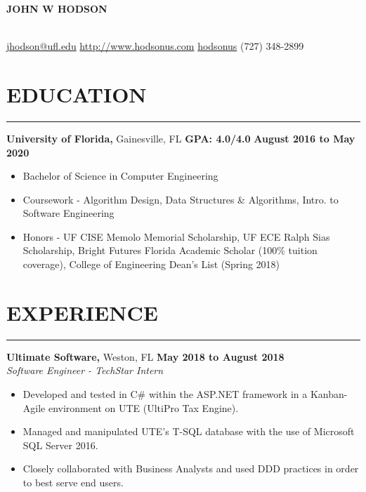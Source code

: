 \documentclass[11pt]{article} %
\begin{document}
	
	\noindent\centerline{ \huge\textbf{JOHN W HODSON}}\\
	
	\noindent\Email\space\href{mailto:jhodson@ufl.edu}{jhodson@ufl.edu} \hspace*{\fill} \ComputerMouse \space \href{http://www.hodsonus.com}{http://www.hodsonus.com} \hspace*{\fill} \faGithub \space \href{https://github.com/hodsonus}{hodsonus} \hspace*{\fill} \Mobilefone \space (727) 348-2899\\
	
	\section*{EDUCATION}
		\hrule \relax
		\vspace{.4cm}
		
		\noindent \textbf{University of Florida,} Gainesville, FL
		\hfill\textbf{GPA: 4.0/4.0}
		\hfill\textbf{August 2016 to May 2020}
		
		\begin{itemize}[noitemsep,nolistsep, label = {-}]
			\item Bachelor of Science in Computer Engineering
			\item Coursework - Algorithm Design, Data Structures \& Algorithms, Intro. to Software Engineering
			\item Honors - UF CISE Memolo Memorial Scholarship, UF ECE Ralph Sias Scholarship, Bright Futures Florida Academic Scholar (100\% tuition coverage), College of Engineering Dean\rq s List (Spring 2018)
		\end{itemize}
		
		\vspace{.1cm}
	
	\section*{EXPERIENCE}
		\hrule \relax
		\vspace{.4cm}
		
		\noindent \textbf{Ultimate Software,} Weston, FL \hfill\textbf{May 2018 to August 2018}\\
		\textit{Software Engineer - TechStar Intern}
		\begin{itemize}[noitemsep,nolistsep, label = {-}]
			\item Developed and tested in C\# within the ASP.NET framework in a Kanban-Agile environment on UTE (UltiPro Tax Engine).
			\item Managed and manipulated UTE's T-SQL database with the use of Microsoft SQL Server 2016.
			\item Closely collaborated with Business Analysts and used DDD practices in order to best serve end users.
		\end{itemize}
	
\end{document}
